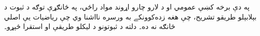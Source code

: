 \documentclass[../../include/open-logic-part]{subfiles}
\begin{document}

\begin{editorial}
  په دې برخه کښې عمومي او د لارو چارو اړوند مواد راځي،
  په ځانګړې توګه د ثبوت د بېلابېلو طريقو تشريح، چې هغه
  زده‌کوونکے به ورسره نااشنا وي چې رياضيات يې اصلي
  څانګه نه ده۔ دلته د ثبوتونو د ليکلو طريقې او استقرا څېړو۔
\end{editorial}



\OLEndPartHook
\end{document}
